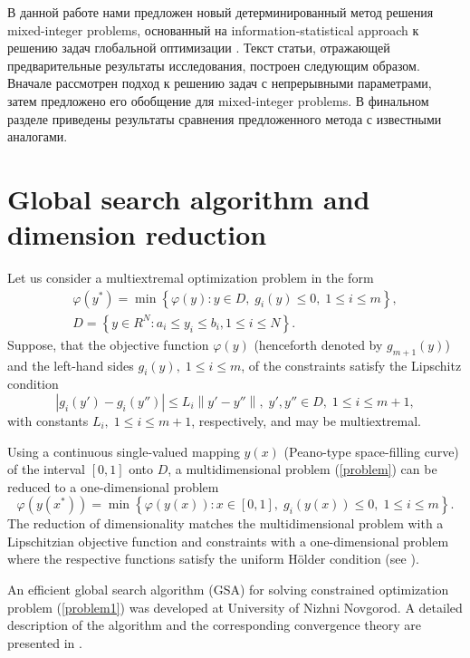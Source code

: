 \documentclass{llncs}
\begin{document}
В данной работе нами предложен новый детерминированный метод решения mixed-integer problems, основанный на information-statistical approach к решению задач глобальной оптимизации \cite{Strongin2000,Strongin2013}. Текст статьи, отражающей предварительные результаты исследования, построен следующим образом. Вначале рассмотрен подход к решению задач с непрерывными параметрами, затем предложено его обобщение для mixed-integer problems. В финальном разделе приведены результаты сравнения предложенного метода с известными аналогами.

\section{Global search algorithm and dimension reduction}

Let us consider a multiextremal optimization problem in the form
\begin{gather}\label{problem}
\varphi(y^\ast)=\min{\left\{\varphi(y):y\in D, \; g_i(y)\leq 0, \; 1 \leq i \leq m\right\}},\\
D=\left\{y\in R^N: a_i\leq y_i \leq b_i, 1\leq i \leq N\right\}.\nonumber
\end{gather}
Suppose, that the objective function $\varphi(y)$ (henceforth denoted by $g_{m+1}(y)$) and
the left-hand sides $g_i(y), \; 1\leq i \leq m$, of the constraints satisfy the Lipschitz condition
\[ 
\left|g_i(y')-g_i (y'')\right| \leq L_i \left\|y'-y'' \right\|, \; y',y''\in D, \; 1\leq i \leq m+1, 
\]
with constants $L_i, \; 1 \leq i \leq m+1$, respectively,  and may be multiextremal.

Using a continuous single-valued mapping $y(x)$  (Peano-type space-filling curve) of the interval $[0,1]$ onto $D$, a multidimensional problem (\ref{problem}) can be reduced to a one-dimensional problem
\begin{equation}\label{problem1}
\varphi(y(x^\ast))=\min \left\{\varphi(y(x)): x \in [0,1], \; g_i(y(x))\leq 0, \; 1 \leq i \leq m\right\}.
\end{equation}
The reduction of dimensionality matches the multidimensional problem with a Lipschitzian objective function and constraints with a one-dimensional problem where the respective functions satisfy the uniform H\"older condition (see \cite{Strongin2000}).

An efficient global search algorithm (GSA) for solving constrained optimization problem (\ref{problem1}) was developed at University of Nizhni Novgorod. A detailed description of the algorithm and the corresponding convergence theory are presented in \cite{Strongin2000}.
\end{document}
